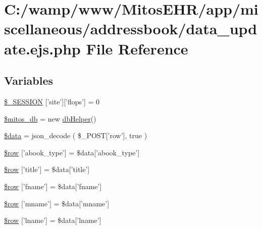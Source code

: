 \hypertarget{miscellaneous_2addressbook_2data__update_8ejs_8php}{\section{\-C\-:/wamp/www/\-Mitos\-E\-H\-R/app/miscellaneous/addressbook/data\-\_\-update.ejs.\-php \-File \-Reference}
\label{miscellaneous_2addressbook_2data__update_8ejs_8php}
}
\subsection*{\-Variables}
\begin{DoxyCompactItemize}
\item 
\hyperlink{miscellaneous_2addressbook_2data__update_8ejs_8php_a99fda8552a3e58235643b79f5af3ded8}{\$\-\_\-\-S\-E\-S\-S\-I\-O\-N} \mbox{[}'site'\mbox{]}\mbox{[}'flops'\mbox{]} = 0
\item 
\hyperlink{miscellaneous_2addressbook_2data__update_8ejs_8php_ab5d961f93efe4e2e8d8374f01dd6c65a}{\$mitos\-\_\-db} = new \hyperlink{classdb_helper}{db\-Helper}()
\item 
\hyperlink{miscellaneous_2addressbook_2data__update_8ejs_8php_a6efc15b5a2314dd4b5aaa556a375c6d6}{\$data} = json\-\_\-decode ( \$\-\_\-\-P\-O\-S\-T\mbox{[}'row'\mbox{]}, true )
\item 
\hyperlink{miscellaneous_2addressbook_2data__update_8ejs_8php_a0d1b6e8abe038ac8d97ac3bcaffc1aec}{\$row} \mbox{[}'abook\-\_\-type'\mbox{]} = \$data\mbox{[}'abook\-\_\-type'\mbox{]}
\item 
\hyperlink{miscellaneous_2addressbook_2data__update_8ejs_8php_a70d36cba6a35524466f2a4c8112c8e4e}{\$row} \mbox{[}'title'\mbox{]} = \$data\mbox{[}'title'\mbox{]}
\item 
\hyperlink{miscellaneous_2addressbook_2data__update_8ejs_8php_a5e241e1f48972b6bd961b356bd5b0b66}{\$row} \mbox{[}'fname'\mbox{]} = \$data\mbox{[}'fname'\mbox{]}
\item 
\hyperlink{miscellaneous_2addressbook_2data__update_8ejs_8php_a59969ea1bfb7b642d6dc27ce674d53c7}{\$row} \mbox{[}'mname'\mbox{]} = \$data\mbox{[}'mname'\mbox{]}
\item 
\hyperlink{miscellaneous_2addressbook_2data__update_8ejs_8php_a448ec3d1709d6ded284a6a9f4e6dbf5c}{\$row} \mbox{[}'lname'\mbox{]} = \$data\mbox{[}'lname'\mbox{]}
\item 

\end{DoxyCompactItemize}
